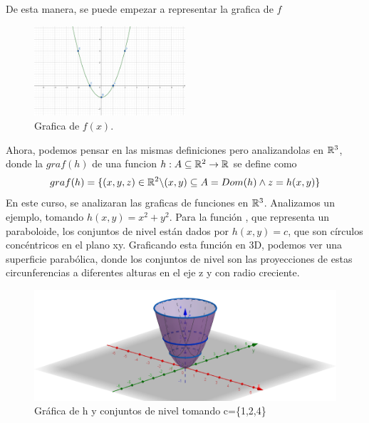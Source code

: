 \begin{definition} [Grafica de $f$]
De esta manera, se puede empezar a representar la grafica de $f$
\begin{figure}[h!] %
    \centering
    \includegraphics[width=0.5\textwidth]{../figs/r2_grafica.png} %
    \caption{Grafica de $f(x)$.}
    \label{fig:ejemplo2} %
\end{figure}
\end{definition}
Ahora, podemos pensar en las mismas definiciones pero analizandolas en $\mathbb{R}^3$, donde la $graf (h)$ de una funcion $h: A\subseteq\mathbb{R}^2\rightarrow\mathbb{R}$ se define como
 \[
graf(h)=\{(x,y,z)\in\mathbb{R}^2 \backslash (x,y)\subseteq A=Dom(h) \land z=h(x,y) \}
 \]
En este curso, se analizaran las graficas de funciones en  $\mathbb{R}^3$. Analizamos un ejemplo, tomando $h(x,y)=x^2+y^2$.
Para la función , que representa un paraboloide, los conjuntos de nivel están dados por $h(x,y)=c$, que son círculos concéntricos en el plano xy. Graficando esta función en 3D, podemos ver una superficie parabólica, donde los conjuntos de nivel son las proyecciones de estas circunferencias a diferentes alturas en el eje z y con radio creciente.
\begin{figure}[h!] %
    \centering
    \includegraphics[width=1\textwidth]{../figs/r3_grafica.png} %
    \caption{\small{ Gráfica de h y conjuntos de nivel tomando 
    c=\{1,2,4}\}}
    \label{fig:ejemplo3} %
\end{figure}

